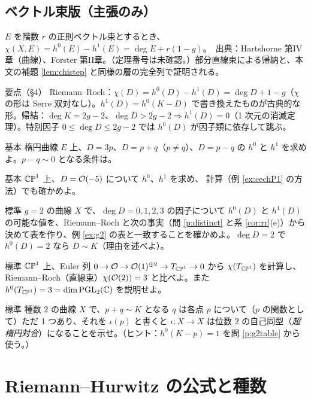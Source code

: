 \subsection{ベクトル束版（主張のみ）}
$E$ を階数 $r$ の正則ベクトル束とするとき、$\chi(X,E)=h^0(E)-h^1(E)=\deg E+r(1-g)$。\tC\ 出典：Hartshorne 第IV章（曲線）、Forster 第II章。\tQ（定理番号は未確認。）部分直線束による帰納と、本文の補題 \ref{lem:chistep} と同様の層の完全列で証明される。

\begin{keybox}{要点（§4）}
Riemann--Roch：$\chi(D)=h^0(D)-h^1(D)=\deg D+1-g$（$\chi$ の形は Serre 双対なし）。$h^1(D)=h^0(K-D)$ で書き換えたものが古典的な形。帰結：$\deg K=2g-2$、$\deg D>2g-2\Rightarrow h^1(D)=0$（1 次元の消滅定理）。特別因子 $0\le\deg D\le2g-2$ では $h^0(D)$ が因子類に依存して跳ぶ。
\end{keybox}

\begin{prob}{基本}\label{p:ellh0}
楕円曲線 $E$ 上、$D=3p$、$D=p+q$（$p\ne q$）、$D=p-q$ の $h^0$ と $h^1$ を求めよ。$p-q\sim0$ となる条件は。
\end{prob}
\begin{prob}{基本}\label{p:P1h0}
$\mathbb{CP}^1$ 上、$D=\mathcal O(-5)$ について $h^0$、$h^1$ を求め、\Cech{} 計算（例 \ref{ex:cechP1} の方法）でも確かめよ。
\end{prob}
\begin{prob}{標準}\label{p:g2table}
$g=2$ の曲線 $X$ で、$\deg D=0,1,2,3$ の因子について $h^0(D)$ と $h^1(D)$ の可能な値を、Riemann--Roch と次の事実（問 \ref{p:distinct} と系 \ref{cor:rr}(e)）から決めて表を作り、例 \ref{ex:g2} の表と一致することを確かめよ。$\deg D=2$ で $h^0(D)=2$ なら $D\sim K$（理由を述べよ）。
\end{prob}
\begin{prob}{標準}\label{p:Pnvect}
$\mathbb{CP}^1$ 上、Euler 列 $0\to\mathcal O\to\mathcal O(1)^{\oplus2}\to T_{\mathbb{CP}^1}\to0$ から $\chi(T_{\mathbb{CP}^1})$ を計算し、Riemann--Roch（直線束）$\chi(\mathcal O(2))=3$ と比べよ。また $h^0(T_{\mathbb{CP}^1})=3=\dim\mathrm{PGL}_2(\mathbb C)$ を説明せよ。
\end{prob}
\begin{prob}{標準}\label{p:conj}
種数 $2$ の曲線 $X$ で、$p+q\sim K$ となる $q$ は各点 $p$ について（$p$ の関数として）ただ 1 つあり、それを $\iota(p)$ と書くと $\iota:X\to X$ は位数 $2$ の自己同型（\emph{超楕円対合}）になることを示せ。（ヒント：$h^0(K-p)=1$ を問 \ref{p:g2table} から使う。）
\end{prob}

\section{Riemann--Hurwitz の公式と種数}\label{sec:rh}

